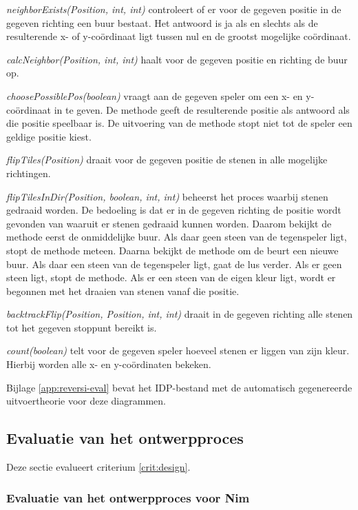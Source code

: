 \textit{neighborExists(Position, int, int)} controleert of er voor de gegeven positie in de gegeven richting een buur bestaat. Het antwoord is ja als en slechts als de resulterende x- of y-co\"ordinaat ligt tussen nul en de grootst mogelijke co\"ordinaat.

\textit{calcNeighbor(Position, int, int)} haalt voor de gegeven positie en richting de buur op.

\textit{choosePossiblePos(boolean)} vraagt aan de gegeven speler om een x- en y-co\"ordinaat in te geven. De methode geeft de resulterende positie als antwoord als die positie speelbaar is. De uitvoering van de methode stopt niet tot de speler een geldige positie kiest.

\textit{flipTiles(Position)} draait voor de gegeven positie de stenen in alle mogelijke richtingen.

\textit{flipTilesInDir(Position, boolean, int, int)} beheerst het proces waarbij stenen gedraaid worden. De bedoeling is dat er in de gegeven richting de positie wordt gevonden van waaruit er stenen gedraaid kunnen worden. Daarom bekijkt de methode eerst de onmiddelijke buur. Als daar geen steen van de tegenspeler ligt, stopt de methode meteen. Daarna bekijkt de methode om de beurt een nieuwe buur. Als daar een steen van de tegenspeler ligt, gaat de lus verder. Als er geen steen ligt, stopt de methode. Als er een steen van de eigen kleur ligt, wordt er begonnen met het draaien van stenen vanaf die positie.

\textit{backtrackFlip(Position, Position, int, int)} draait in de gegeven richting alle stenen tot het gegeven stoppunt bereikt is.

\textit{count(boolean)} telt voor de gegeven speler hoeveel stenen er liggen van zijn kleur. Hierbij worden alle x- en y-co\"ordinaten bekeken.

Bijlage \ref{app:reversi-eval} bevat het IDP-bestand met de automatisch gegenereerde uitvoertheorie voor deze diagrammen.

\subsection{Evaluatie van het ontwerpproces}

Deze sectie evalueert criterium \ref{crit:design}.

\subsubsection{Evaluatie van het ontwerpproces voor Nim}

